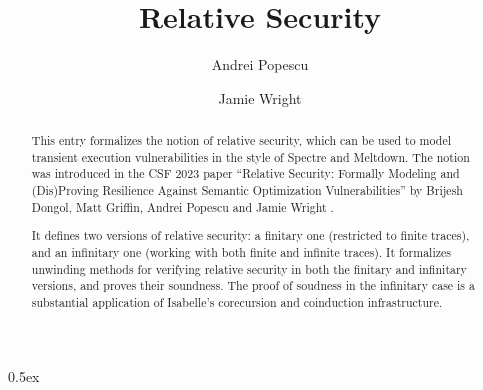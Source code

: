\documentclass[11pt,a4paper]{article}
\begin{document}
\title{Relative Security}
\author{Andrei Popescu \and Jamie Wright}
\maketitle

\begin{abstract}
	This entry formalizes the notion of relative security, which can be used to model transient execution vulnerabilities in the style of Spectre and Meltdown. 
	The notion was introduced in the CSF 2023 paper 
	``Relative Security: Formally Modeling and (Dis)Proving Resilience Against Semantic Optimization Vulnerabilities'' by Brijesh Dongol, Matt Griffin, Andrei Popescu and Jamie Wright \cite{relsec-CSF2023}. 
	
	It defines two versions of relative security: a finitary one (restricted to finite traces), and an infinitary one (working with both finite and infinite traces). 
	It formalizes unwinding methods for verifying relative security in both the finitary and infinitary versions, and proves their soundness.  The proof of soudness in the infinitary case is a substantial application of Isabelle's corecursion and coinduction infrastructure. 
\end{abstract}

\tableofcontents


 
\parindent 0pt\parskip 0.5ex





\end{document}
